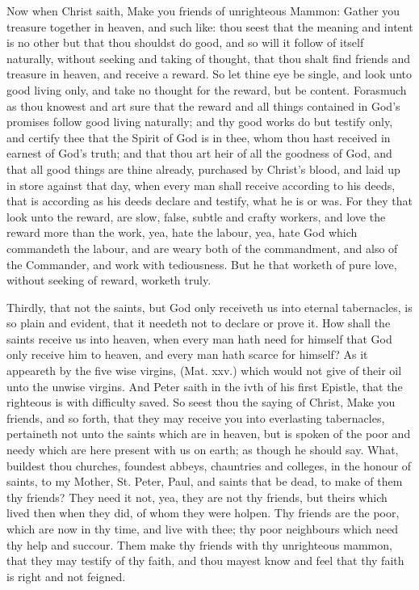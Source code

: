 Now when Christ saith, Make you friends of unrighteous 
Mammon: Gather you treasure together in heaven, and 
such like: thou seest that the meaning and intent is no 
other but that thou shouldst do good, and so will it follow 
of itself naturally, without seeking and taking of thought, 
that thou shalt find friends and treasure in heaven, and 
receive a reward. So let thine eye be single, and look 
unto good living only, and take no thought for the reward, 
but be content. Forasmuch as thou knowest and art sure 
that the reward and all things contained in God's promises 
follow good living naturally; and thy good works do but 
testify only, and certify thee that the Spirit of God is in 
thee, whom thou hast received in earnest of God's truth; 
and that thou art heir of all the goodness of God, and that 
all good things are thine already, purchased by Christ's blood, 
and laid up in store against that day, when every man shall 
receive according to his deeds, that is according as his 
deeds declare and testify, what he is or was. For they 
that look unto the reward, are slow, false, subtle and crafty 
workers, and love the reward more than the work, yea, 
hate the labour, yea, hate God which commandeth the 
labour, and are weary both of the commandment, and 
also of the Commander, and work with tediousness. But 
he that worketh of pure love, without seeking of reward, 
worketh truly. 

Thirdly, that not the saints, but God only receiveth us 
into eternal tabernacles, is so plain and evident, that it 
needeth not to declare or prove it. How shall the saints 
receive us into heaven, when every man hath need for himself
that God only receive him to heaven, and every man 
hath scarce for himself? As it appeareth by the five wise 
virgins, (Mat. xxv.) which would not give of their oil unto 
the unwise virgins. And Peter saith in the ivth of his 
first Epistle, that the righteous is with difficulty saved. 
So seest thou the saying of Christ, Make you friends, and 
so forth, that they may receive you into everlasting tabernacles,
pertaineth not unto the saints which are in heaven, 
but is spoken of the poor and needy which are here present 
with us on earth; as though he should say. What, buildest 
thou churches, foundest abbeys, chauntries and colleges, 
in the honour of saints, to my Mother, St. Peter, Paul, and 
saints that be dead, to make of them thy friends? They 
need it not, yea, they are not thy friends, but theirs which 
lived then when they did, of whom they were holpen. 
Thy friends are the poor, which are now in thy time, and 
live with thee; thy poor neighbours which need thy help 
and succour. Them make thy friends with thy unrighteous
mammon, that they may testify of thy faith, and thou mayest
know and feel that thy faith is right and not feigned.

